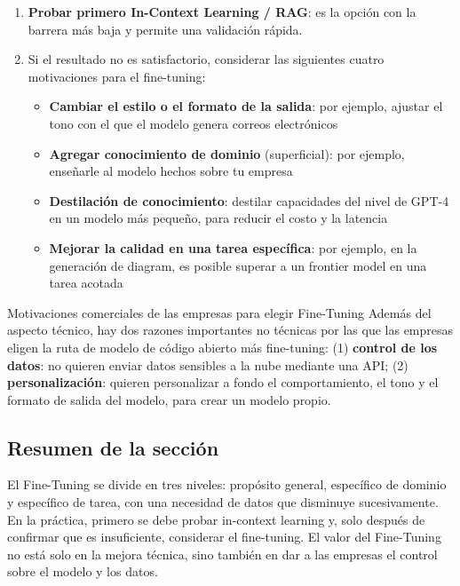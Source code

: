 \documentclass[a4paper]{article}
\begin{document}
\begin{enumerate}
    \item \textbf{Probar primero In-Context Learning / RAG}: es la opción con la barrera más baja y permite una validación rápida.
    \item Si el resultado no es satisfactorio, considerar las siguientes cuatro motivaciones para el fine-tuning:
    \begin{itemize}
        \item \textbf{Cambiar el estilo o el formato de la salida}: por ejemplo, ajustar el tono con el que el modelo genera correos electrónicos
        \item \textbf{Agregar conocimiento de dominio} (superficial): por ejemplo, enseñarle al modelo hechos sobre tu empresa
        \item \textbf{Destilación de conocimiento}: destilar capacidades del nivel de GPT-4 en un modelo más pequeño, para reducir el costo y la latencia
        \item \textbf{Mejorar la calidad en una tarea específica}: por ejemplo, en la generación de diagram, es posible superar a un frontier model en una tarea acotada
    \end{itemize}
\end{enumerate}

\begin{knowledgebox}{Motivaciones comerciales de las empresas para elegir Fine-Tuning}
Además del aspecto técnico, hay dos razones importantes no técnicas por las que las empresas eligen la ruta de modelo de código abierto más fine-tuning: (1) \textbf{control de los datos}: no quieren enviar datos sensibles a la nube mediante una API; (2) \textbf{personalización}: quieren personalizar a fondo el comportamiento, el tono y el formato de salida del modelo, para crear un modelo propio.
\end{knowledgebox}

\subsection{Resumen de la sección}

El Fine-Tuning se divide en tres niveles: propósito general, específico de dominio y específico de tarea, con una necesidad de datos que disminuye sucesivamente. En la práctica, primero se debe probar in-context learning y, solo después de confirmar que es insuficiente, considerar el fine-tuning. El valor del Fine-Tuning no está solo en la mejora técnica, sino también en dar a las empresas el control sobre el modelo y los datos.
\end{document}

